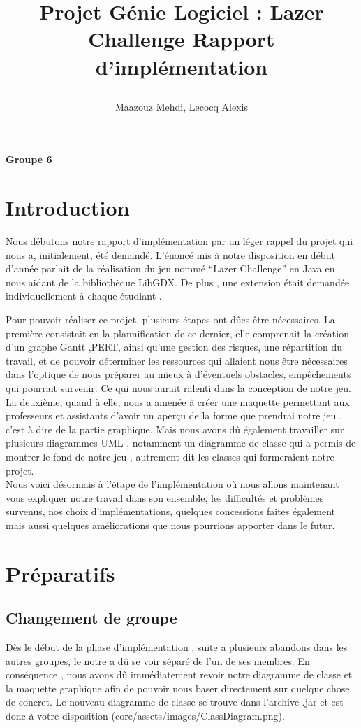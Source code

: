 \documentclass[a4paper,10pt]{article}
\title{
    \begin{minipage}\linewidth
        \centering\bfseries\sffamily
        Projet Génie Logiciel : Lazer Challenge
        \vskip3pt
        \large Rapport d'implémentation
    \end{minipage}
    }
\author{Maazouz Mehdi, Lecocq Alexis}
\begin{document}
\maketitle
\textbf{Groupe 6}
\tableofcontents
\newpage
\section{Introduction}
  Nous débutons notre rapport d'implémentation par un léger rappel du projet qui nous a, initialement, été demandé. 
L'énoncé mis à notre disposition en début d'année parlait de la réalisation du jeu nommé ``Lazer Challenge'' en Java
en nous aidant de la bibliothèque LibGDX. De plus , une extension était demandée individuellement à chaque étudiant .

Pour pouvoir réaliser ce projet, plusieurs étapes ont dûes être nécessaires. La première consistait en la plannification de ce dernier,
 elle comprenait la création d'un graphe Gantt ,PERT, ainsi qu'une gestion des risques, une répartition du travail,
 et de pouvoir déterminer les ressources qui allaient nous être nécessaires dans l'optique de nous préparer au mieux à d'éventuels
 obstacles, empêchements qui pourrait survenir. Ce qui nous aurait ralenti dans la conception de notre jeu.\\ La deuxième, quand à elle, nous a amenée
 à créer une maquette permettant aux professeurs et assistants d'avoir un aperçu de la forme que prendrai notre jeu , c'est à dire de la partie graphique.
 Mais nous avons dû également travailler sur plusieurs diagrammes UML , notamment un diagramme de classe qui a permis de montrer le fond de notre jeu , autrement dit les classes
 qui formeraient notre projet.\\
 Nous voici désormais à l'étape de l'implémentation où nous allons maintenant vous expliquer notre travail dans son ensemble,
 les difficultés et problèmes survenus, nos choix d'implémentations, quelques concessions faites également mais aussi quelques améliorations que nous
 pourrions apporter dans le futur.
\section{Préparatifs}
\subsection{Changement de groupe} 
Dès le début de la phase d'implémentation , suite a plusieurs abandons dans les autres groupes, le notre a dû se voir séparé de l'un de ses membres.
En conséquence , nous avons dû immédiatement revoir notre diagramme de classe et la maquette graphique afin de pouvoir nous baser directement sur quelque chose
de concret. Le nouveau diagramme de classe se trouve dans l'archive .jar et est donc à votre disposition (core/assets/images/ClassDiagram.png).
\end{document}
